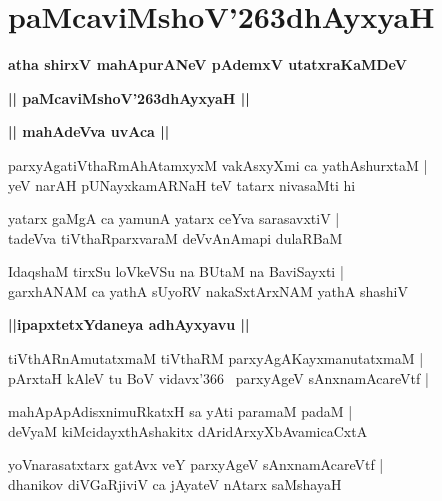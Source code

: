 \documentclass[twoside,12pt,openright]{book}
\def\S{\char'263}
\newcounter{shloka}[chapter]
\def\uvaca#1{\centerline{{\large\textbf{#1}}}}
\begin{document}
\chapter{paMcaviMshoV\S dhAyxyaH}

\begin{center}
{\LARGE\bfseries atha shirxV mahApurANeV pAdemxV utatxraKaMDeV} 
\end{center}

\begin{center}
{\LARGE\bfseries  || paMcaviMshoV\S dhAyxyaH ||}
\end{center}

\uvaca{|| mahAdeVva uvAca ||}

\begin{shloka}%
parxyAgatiVthaRmAhAtamxyxM vakAsxyXmi ca yathAshurxtaM |\\
yeV narAH pUNayxkamARNaH teV tatarx nivasaMti hi
\end{shloka}

\begin{shloka}%
yatarx gaMgA ca yamunA yatarx ceYva sarasavxtiV |\\
tadeVva tiVthaRparxvaraM deVvAnAmapi dulaRBaM 
\end{shloka}

\begin{shloka}%
IdaqshaM tirxSu loVkeVSu na BUtaM na BaviSayxti |\\
garxhANAM ca yathA sUyoRV nakaSxtArxNAM yathA shashiV
\end{shloka}

\uvaca{||ipapxtetxYdaneya adhAyxyavu ||}

\begin{shloka}%
tiVthARnAmutatxmaM tiVthaRM parxyAgAKayxmanutatxmaM |\\
pArxtaH kAleV tu BoV vidavx\char'366 ~parxyAgeV sAnxnamAcareVtf |\\
\end{shloka}

\begin{shloka}%
mahApApAdisxnimuRkatxH sa yAti paramaM padaM |\\
deVyaM kiMcidayxthAshakitx dAridArxyXbAvamicaCxtA 
\end{shloka}

\begin{shloka}%
yoVnarasatxtarx gatAvx veY parxyAgeV sAnxnamAcareVtf |\\
dhanikov diVGaRjiviV ca jAyateV nAtarx saMshayaH 
\end{shloka}
\end{document}
